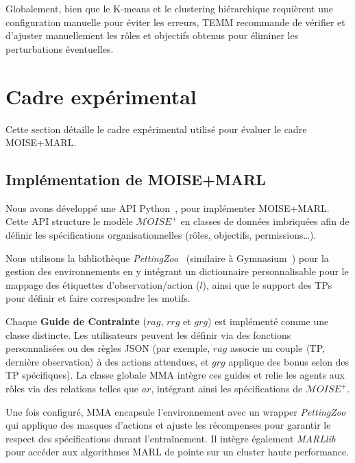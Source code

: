 \documentclass[final]{jfsma}
\begin{document}
Globalement, bien que le K-means et le clustering hiérarchique requièrent une configuration manuelle pour éviter les erreurs, TEMM recommande de vérifier et d'ajuster manuellement les rôles et objectifs obtenus pour éliminer les perturbations éventuelles.


\section{Cadre expérimental}
\label{sec:experimental_setup}

Cette section détaille le cadre expérimental utilisé pour évaluer le cadre MOISE+MARL.

\subsection{Implémentation de MOISE+MARL}

Nous avons développé une API Python~\hyperref[fn:github]{\footnotemark[2]}, pour implémenter MOISE+MARL. Cette API structure le modèle \(\mathcal{M}OISE^+\) en classes de données imbriquées afin de définir les spécifications organisationnelles (rôles, objectifs, permissions\dots).

Nous utilisons la bibliothèque \textit{PettingZoo}~\cite{terry2020pettingzoo} (similaire à Gymnasium~\cite{kwiatkowski2024}) pour la gestion des environnements en y intégrant un dictionnaire personnalisable pour le mappage des étiquettes d'observation/action (\(l\)), ainsi que le support des TPs pour définir et faire correspondre les motifs.

Chaque \textbf{Guide de Contrainte} (\(rag\), \(rrg\) et \(grg\)) est implémenté comme une classe distincte. Les utilisateurs peuvent les définir via des fonctions personnalisées ou des règles JSON (par exemple, \(rag\) associe un couple \(\langle\)TP, dernière observation\(\rangle\) à des actions attendues, et \(grg\) applique des bonus selon des TP spécifiques). La classe globale MMA intègre ces guides et relie les agents aux rôles via des relations telles que \(ar\), intégrant ainsi les spécifications de \(\mathcal{M}OISE^+\).

Une fois configuré, MMA encapsule l'environnement avec un wrapper \textit{PettingZoo} qui applique des masques d'actions et ajuste les récompenses pour garantir le respect des spécifications durant l'entraînement. Il intègre également \textit{MARLlib}~\cite{hu2021marlib} pour accéder aux algorithmes MARL de pointe sur un cluster haute performance.
\end{document}
